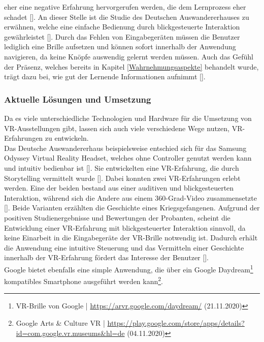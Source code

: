 \documentclass[a4paper,12pt,oneside]{article}
\begin{document}
        eher eine negative Erfahrung hervorgerufen werden, die dem Lernprozess eher
        schadet [\cite[777]{Katz2015}]. An dieser Stelle ist die
        Studie des Deutschen Auswandererhauses zu erwähnen, welche eine einfache
        Bedienung durch blickgesteuerte Interaktion gewährleistet [\cite[38]{Heidsiek2019}].
        Durch das Fehlen von Eingabegeräten müssen die Benutzer lediglich 
        eine Brille aufsetzen und können
        sofort innerhalb der Anwendung navigieren, da keine Knöpfe
        auswendig gelernt werden müssen.
        Auch das Gefühl der Präsenz, welches bereits in Kapitel \ref{Wahrnehmungsaspekte}
        behandelt wurde, trägt dazu bei, wie gut der Lernende Informationen aufnimmt
        [\cite[777]{Katz2015}].
      \subsubsection{Aktuelle Lösungen und Umsetzung} \label{Aktuelle Lösungen und Umsetzung}
        Da es viele unterschiedliche Technologien und Hardware für die Umsetzung von 
        VR-Ausstellungen 
        gibt, lassen sich auch viele verschiedene Wege nutzen, VR-Erfahrungen 
        zu entwickeln. \\
        Das Deutsche Auswandererhaus beispielsweise entschied sich für das Samsung Odyssey
        Virtual Reality Headset, welches ohne Controller genutzt werden kann und intuitiv
        bedienbar ist [\cite[35]{Heidsiek2019}]. Sie entwickelten eine VR-Erfahrung, die
        durch Storytelling vermittelt wurde [\cite[35-39]{Heidsiek2019}]. Dabei
        konnten zwei VR-Erfahrungen erlebt werden. Eine der beiden bestand aus einer 
        auditiven und
        blickgesteuerten Interaktion, während sich die Andere aus 
        einem 360-Grad-Video zusammensetzte [\cite[38]{Heidsiek2019}]. Beide Varianten
        erzählten die Geschichte eines Kriegsgefangenen.
        Aufgrund der positiven Studienergebnisse und Bewertungen der Probanten, scheint
        die Entwicklung einer VR-Erfahrung mit blickgesteuerter Interaktion sinnvoll, da
        keine Einarbeit in die Eingabegeräte der VR-Brille notwendig ist. Dadurch erhält
        die Anwendung eine intuitive Steuerung und das Vermitteln einer Geschichte 
        innerhalb der VR-Erfahrung fördert das Interesse der Benutzer [\cite[35-39]{Heidsiek2019}]. \\
        Google bietet ebenfalls eine simple Anwendung, die über ein Google Daydream\footnote{VR-Brille von Google | \url{https://arvr.google.com/daydream/} (21.11.2020)}
        kompatibles Smartphone ausgeführt werden kann\footnote{Google Arts \& Culture VR | \url{https://play.google.com/store/apps/details?id=com.google.vr.museums&hl=de} (04.11.2020)}.
\end{document}
